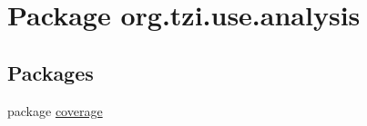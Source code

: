 \hypertarget{namespaceorg_1_1tzi_1_1use_1_1analysis}{\section{Package org.\-tzi.\-use.\-analysis}
\label{namespaceorg_1_1tzi_1_1use_1_1analysis}
}
\subsection*{Packages}
\begin{DoxyCompactItemize}
\item 
package \hyperlink{namespaceorg_1_1tzi_1_1use_1_1analysis_1_1coverage}{coverage}
\end{DoxyCompactItemize}
